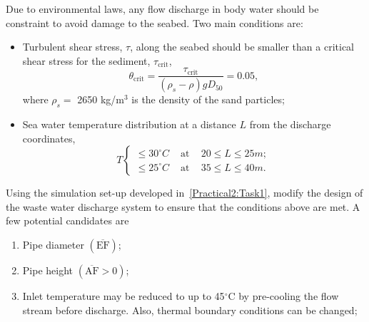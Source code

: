 \documentclass[12pts,a4paper,amsmath,amssymb,floatfix]{article}%
\renewcommand\leq{\leqslant}
\newcommand{\frc}{\displaystyle\frac}
\begin{document}
\begin{enumerate}[label=\bfseries Problem \arabic*:]
\begin{enumerate}[label=\bfseries Task \arabic*]
Due to environmental laws, any flow discharge in body water should be constraint to avoid damage to the seabed. Two main conditions are:
   \begin{itemize}
        \item Turbulent shear stress, $\tau$, along the seabed should be smaller than a critical shear stress for the sediment, $\tau_{\text{crit}}$,
            \begin{displaymath}
               \theta_{\text{crit}} = \frc{\tau_{\text{crit}}}{\left(\rho_{s}-\rho\right)g D_{50}} = 0.05,
            \end{displaymath}
             where $\rho_{s}=$ 2650 kg/m$^{3}$ is the density of the sand particles;
        \item Sea water temperature distribution at a distance $L$ from the discharge coordinates,
         \[ T \begin{cases}
             \leq 30^{\circ}C & \text{ at } \;\;\; 20 \leq L \leq 25 m; \\
             \leq 25^{\circ}C & \text{ at } \;\;\; 35 \leq L \leq 40 m.
         \end{cases}\]  
   \end{itemize}

Using the simulation set-up developed in~\ref{Practical2:Task1}, modify the design of the waste water discharge system  to ensure that the conditions above are met. A few potential candidates are 
   \begin{enumerate}
      \item Pipe diameter $\left(\overline{\text{EF}}\right)$;
      \item Pipe height $\left(\overline{\text{AF}} > 0\right)$;
      \item Inlet temperature may be reduced to up to 45$^{\circ}$C by pre-cooling the flow stream before discharge. Also, thermal boundary conditions can be changed;
   \end{enumerate}

\end{enumerate}

\end{enumerate}
\clearpage
\end{document}
